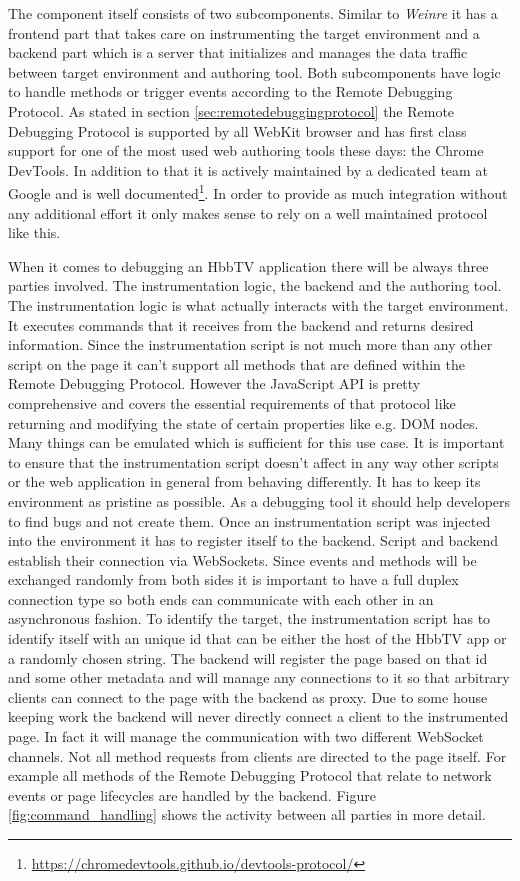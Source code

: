 The component itself consists of two subcomponents. Similar to \textit{Weinre} it has a frontend
part that takes care on instrumenting the target environment and a backend part which is a server
that initializes and manages the data traffic between target environment and authoring tool. Both
subcomponents have logic to handle methods or trigger events according to the Remote Debugging
Protocol. As stated in section \ref{sec:remotedebuggingprotocol} the Remote Debugging Protocol is
supported by all WebKit browser and has first class support for one of the most used web authoring
tools these days: the Chrome DevTools. In addition to that it is actively maintained by a dedicated
team at Google and is well documented\footnote{\url{https://chromedevtools.github.io/devtools-protocol/}}.
In order to provide as much integration without any additional effort it only makes sense to rely on
a well maintained protocol like this.

When it comes to debugging an HbbTV application there will be always three parties involved. The
instrumentation logic, the backend and the authoring tool. The instrumentation logic is what actually
interacts with the target environment. It executes commands that it receives from the backend and
returns desired information. Since the instrumentation script is not much more than any other script
on the page it can't support all methods that are defined within the Remote Debugging Protocol.
However the JavaScript API is pretty comprehensive and covers the essential requirements of that
protocol like returning and modifying the state of certain properties like e.g. DOM nodes. Many things can
be emulated which is sufficient for this use case. It is important to ensure that the instrumentation
script doesn't affect in any way other scripts or the web application in general from behaving
differently. It has to keep its environment as pristine as possible. As a debugging tool it should
help developers to find bugs and not create them. Once an instrumentation script was injected
into the environment it has to register itself to the backend. Script and backend establish their
connection via WebSockets. Since events and methods will be exchanged randomly from both sides
it is important to have a full duplex connection type so both ends can communicate with each other
in an asynchronous fashion. To identify the target, the instrumentation script has to identify
itself with an unique id that can be either the host of the HbbTV app or a randomly chosen string. The
backend will register the page based on that id and some other metadata and will manage any
connections to it so that arbitrary clients can connect to the page with the backend as proxy. Due
to some house keeping work the backend will never directly connect a client to the instrumented
page. In fact it will manage the communication with two different WebSocket channels. Not all method
requests from clients are directed to the page itself. For example all methods of the Remote Debugging
Protocol that relate to network events or page lifecycles are handled by the backend. Figure
\ref{fig:command_handling} shows the activity between all parties in more detail.

